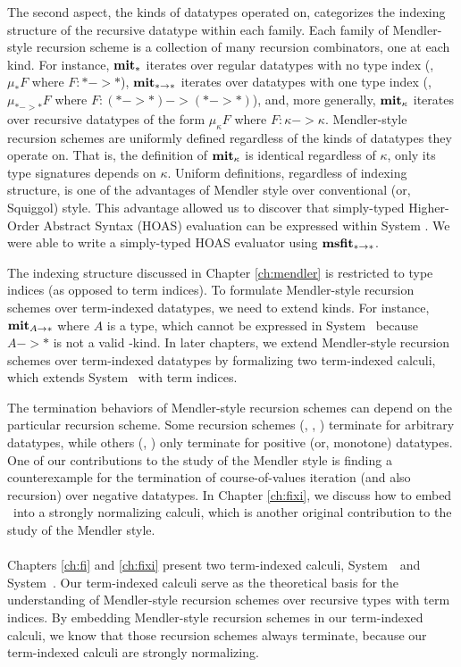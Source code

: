 The second aspect, the kinds of datatypes operated on, categorizes
the indexing structure of the recursive datatype within each family.
Each family of Mendler-style recursion scheme is a collection of
many recursion combinators, one at each kind. For instance, $\mathbf{mit}_{*}$
iterates over regular datatypes with no type index (\ie, $\mu_{*}F$
where $F : * -> *$), $\mathbf{mit}_{* -> *}$ iterates over datatypes with
one type index (\ie, $\mu_{* -> *} F$ where $F : (* -> *) -> (* -> *)$),
and, more generally, $\mathbf{mit}_{\kappa}$ iterates over recursive datatypes of
the form $\mu_{\kappa}F$ where $F : \kappa -> \kappa$.
Mendler-style recursion schemes are uniformly defined regardless of the kinds
of datatypes they operate on. That is, the definition of $\mathbf{mit}_{\kappa}$ is
identical regardless of $\kappa$, only its type signatures depends on $\kappa$.
Uniform definitions, regardless of indexing structure, is one of the advantages
of Mendler style over conventional (or, Squiggol) style. This advantage allowed
us to discover that simply-typed Higher-Order Abstract Syntax (HOAS) evaluation
can be expressed within System \Fw. We were able to write a simply-typed HOAS
evaluator using $\mathbf{msfit}_{* -> *}$.

The indexing structure discussed in Chapter \ref{ch:mendler} is restricted to
type indices (as opposed to term indices). To formulate Mendler-style recursion
schemes over term-indexed datatypes, we need to extend kinds. For instance,
$\mathbf{mit}_{A -> *}$ where $A$ is a type, which cannot be expressed in System \Fw\ 
because $A -> *$ is not a valid \Fw-kind. In later chapters, we extend
Mendler-style recursion schemes over term-indexed datatypes by formalizing
two term-indexed calculi, which extends System \Fw\ with term indices.

The termination behaviors of Mendler-style recursion schemes can depend on
the particular recursion scheme. Some recursion schemes (\MIt, \MPr, \MsfIt)
terminate for arbitrary datatypes, while others (\McvPr, \McvIt) only terminate
for positive (or, monotone) datatypes. One of our contributions to the study of
the Mendler style is finding a counterexample for the termination of
course-of-values iteration (and also recursion) over negative datatypes.
In Chapter \ref{ch:fixi}, we discuss how to embed \McvPr\ into
a strongly normalizing calculi, which is another original contribution to
the study of the Mendler style.

\paragraph{}
Chapters \ref{ch:fi} and \ref{ch:fixi} present two term-indexed calculi,
System~\Fi\ and System~\Fixi. Our term-indexed calculi serve as
the theoretical basis for the understanding of Mendler-style recursion schemes
over recursive types with term indices. By embedding Mendler-style recursion
schemes in our term-indexed calculi, we know that those recursion schemes
always terminate, because our term-indexed calculi are strongly normalizing.


